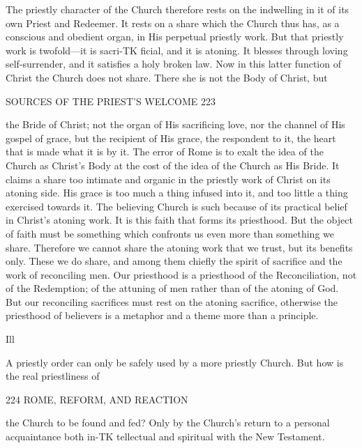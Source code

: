 \documentclass[12pt,a5paper,oneside]{book}
\begin{document}
{{The priestly character of the Church therefore rests 
on the indwelling in it of its own Priest and Redeemer. 
It rests on a share which the Church thus has, as a 
conscious and obedient organ, in His perpetual priestly 
work. But that priestly work is twofold---it is sacri-TK
ficial, and it is atoning. It blesses through loving 
self-surrender, and it satisfies a holy broken law. 
Now in this latter function of Christ the Church does 
not share. There she is not the Body of Christ, but 



SOURCES OF THE PRIEST'S WELCOME 223 

the Bride of Christ; not the organ of His sacrificing 
love, nor the channel of His gospel of grace, but the 
recipient of His grace, the respondent to it, the heart 
that is made what it is by it. The error of Rome is 
to exalt the idea of the Church as Christ's Body at the 
cost of the idea of the Church as His Bride. It 
claims a share too intimate and organic in the priestly 
work of Christ on its atoning side. His grace is too 
much a thing infused into it, and too little a thing 
exercised towards it. The believing Church is such 
because of its practical belief in Christ's atoning work. 
It is this faith that forms its priesthood. But the object 
of faith must be something which confronts us even 
more than something we share. Therefore we cannot 
share the atoning work that we trust, but its benefits 
only. These we do share, and among them chiefly 
the spirit of sacrifice and the work of reconciling men. 
Our priesthood is a priesthood of the Reconciliation, 
not of the Redemption; of the attuning of men rather 
than of the atoning of God. But our reconciling 
sacrifices must rest on the atoning sacrifice, otherwise 
the priesthood of believers is a metaphor and a theme 
more than a principle. 

Ill 

A priestly order can only be safely used by a more 
priestly Church. But how is the real priestliness of 



224 ROME, REFORM, AND REACTION 

the Church to be found and fed? Only by the 
Church's return to a personal acquaintance both in-TK
tellectual and spiritual with the New Testament. 

}}
\end{document}
